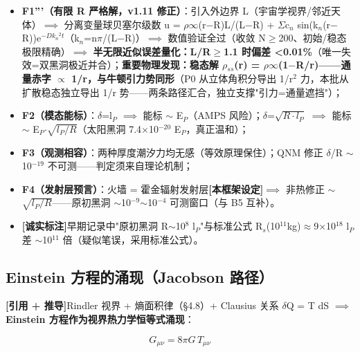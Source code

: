 \documentclass[UTF8,fontset=windows]{csoarticle}
\newcommand{\mtag}[1]{\textbf{[#1]}}
\newcommand{\up}[1]{\ensuremath{^{#1}}}
\newcommand{\down}[1]{\ensuremath{_{#1}}}
\begin{document}
\begin{itemize}
\item \textbf{F1'''（有限 R 严格解，v1.11 修正）}：引入外边界 L（宇宙学视界/邻近天体）\ensuremath{\implies} 分离变量球贝塞尔级数 u = \ensuremath{\rho}\ensuremath{\infty}(r\ensuremath{-}R)L/(L\ensuremath{-}R) + \ensuremath{\Sigma}c\down{n} sin(k\down{n}(r\ensuremath{-}R))e\up{-Dk\down{n}^{2}t}（k\down{n}=n\ensuremath{\pi}/(L\ensuremath{-}R)）\ensuremath{\implies} 数值验证全过（收敛 N\ensuremath{\geq}200、初始/稳态极限精确）\ensuremath{\implies} \textbf{半无限近似误差量化：L/R\ensuremath{\geq}1.1 时偏差 <0.01\%}（唯一失效=双黑洞极近并合）；\textbf{重要物理发现：稳态解 \ensuremath{\rho}\down{ss}(r) = \ensuremath{\rho}\ensuremath{\infty}(1\ensuremath{-}R/r)------通量赤字 \ensuremath{\propto} 1/r，与牛顿引力势同形}（P0 从立体角积分导出 1/r\up{2} 力，本批从扩散稳态独立导出 1/r 势------两条路径汇合，独立支撑"引力=通量遮挡"）；
\item \textbf{F2（模态能标）}：\ensuremath{\delta}=l\down{P} \ensuremath{\implies} 能标 \ensuremath{\sim} E\down{P}（AMPS 风险）；\ensuremath{\delta}=\ensuremath{\sqrt{R\cdot{}l\down{P}}} \ensuremath{\implies} 能标 \ensuremath{\sim} E\down{P}\ensuremath{\cdot}\ensuremath{\sqrt{l\down{P}/R}}（太阳黑洞 7.4\ensuremath{\times}10\up{-20} E\down{P}，真正温和）；
\item \textbf{F3（观测相容）}：两种厚度潮汐力均无感（等效原理保住）；QNM 修正 \ensuremath{\delta}/R \ensuremath{\sim} 10\up{-19} 不可测------判定须来自理论机制；
\item \textbf{F4（发射层预言）}：火墙 = 霍金辐射发射层\mtag{本框架设定}\ensuremath{\implies} 非热修正 \ensuremath{\sim} \ensuremath{\sqrt{l\down{P}/R}}------原初黑洞 \ensuremath{\sim}10\up{-9}\ensuremath{\sim}10\up{-4} 可测窗口（与 B5 互补）。
\item \mtag{诚实标注}早期记录中"原初黑洞 R\ensuremath{\sim}10\up{8} l\down{P}"与标准公式 R\down{s}(10\up{11}kg)\ensuremath{\approx}9\ensuremath{\times}10\up{18} l\down{P} 差 \ensuremath{\sim}10\up{11} 倍（疑似笔误，采用标准公式）。
\end{itemize}

\subsection{Einstein 方程的涌现（Jacobson 路径）}

\mtag{引用 + 推导}Rindler 视界 + 熵面积律（\S{}4.8）+ Clausius 关系 \ensuremath{\delta}Q = T dS \ensuremath{\implies} \textbf{Einstein 方程作为视界热力学恒等式涌现}：

\[G_{\mu\nu} = 8\pi G\,T_{\mu\nu}\]
\end{document}
